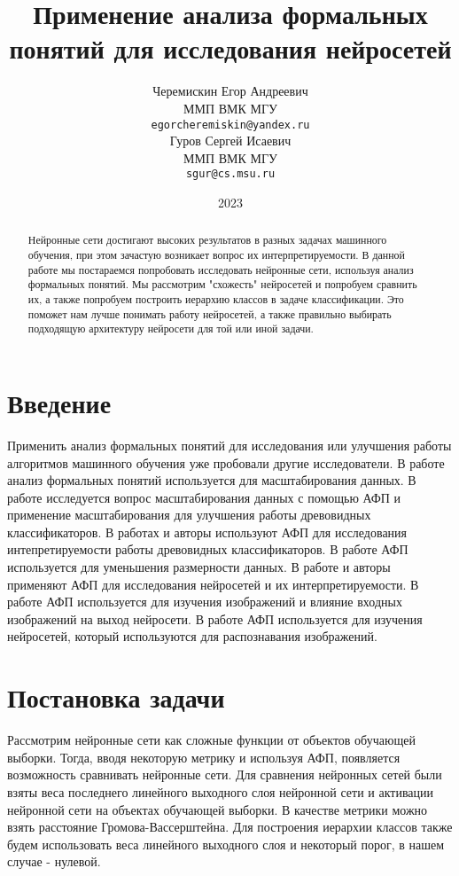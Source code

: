 \documentclass{article}
\title{Применение анализа формальных понятий для исследования нейросетей}
\author{ Черемискин Егор Андреевич \\
	ММП ВМК МГУ \\
	\texttt{egorcheremiskin@yandex.ru} \\
    \And
	Гуров Сергей Исаевич\\
	ММП ВМК МГУ\\
	\texttt{sgur@cs.msu.ru} \\
}
\date{2023}
\begin{document}
\maketitle

\begin{abstract}

Нейронные сети достигают высоких результатов в разных задачах машинного обучения, при этом зачастую возникает вопрос их интерпретируемости. В данной работе мы постараемся попробовать исследовать нейронные сети, используя анализ формальных понятий. Мы рассмотрим "схожесть" нейросетей и попробуем сравнить их, а также попробуем построить иерархию классов в задаче классификации. Это поможет нам лучше понимать работу нейросетей, а также правильно выбирать подходящую архитектуру нейросети для той или иной задачи.
 
\end{abstract}


\section{Введение}

Применить анализ формальных понятий для исследования или улучшения работы алгоритмов машинного обучения уже пробовали другие исследователи. В работе \citep{r1} анализ формальных понятий используется для масштабирования данных. В работе \citep{r2} исследуется вопрос масштабирования данных с помощью АФП и применение масштабирования для улучшения работы древовидных классификаторов. В работах \citep{r3} и \citep{r9} авторы используют АФП для исследования интепретируемости работы древовидных классификаторов. В работе \citep{r6} АФП используется для уменьшения размерности данных. В работе \citep{r4} и \citep{r5} авторы применяют АФП для исследования нейросетей и их интерпретируемости. В работе \citep{r7} АФП используется для изучения изображений и влияние входных изображений на выход нейросети. В работе \citep{r8} АФП используется для изучения нейросетей, который используются для распознавания изображений. 

\section{Постановка задачи}

Рассмотрим нейронные сети как сложные функции от объектов обучающей выборки. Тогда, вводя некоторую метрику и используя АФП, появляется возможность сравнивать нейронные сети. Для сравнения нейронных сетей были взяты веса последнего линейного выходного слоя нейронной сети и активации нейронной сети на объектах обучающей выборки. В качестве метрики можно взять расстояние Громова-Вассерштейна. Для построения иерархии классов также будем использовать веса линейного выходного слоя и некоторый порог, в нашем случае - нулевой. 
\end{document}
